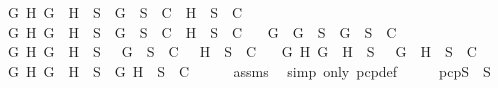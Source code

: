 \begin{isabellebody}
\ \ {\isasymand}\ {\isacharparenleft}{\isasymforall}G\ H{\isachardot}\ G\ \isactrlbold {\isasymor}\ H\ {\isasymin}\ S\ {\isasymlongrightarrow}\ {\isacharbraceleft}G{\isacharbraceright}\ {\isasymunion}\ S\ {\isasymin}\ C\ {\isasymor}\ {\isacharbraceleft}H{\isacharbraceright}\ {\isasymunion}\ S\ {\isasymin}\ C{\isacharparenright}\isanewline
\ \ {\isasymand}\ {\isacharparenleft}{\isasymforall}G\ H{\isachardot}\ G\ \isactrlbold {\isasymrightarrow}\ H\ {\isasymin}\ S\ {\isasymlongrightarrow}\ {\isacharbraceleft}\isactrlbold {\isasymnot}G{\isacharbraceright}\ {\isasymunion}\ S\ {\isasymin}\ C\ {\isasymor}\ {\isacharbraceleft}H{\isacharbraceright}\ {\isasymunion}\ S\ {\isasymin}\ C{\isacharparenright}\isanewline
\ \ {\isasymand}\ {\isacharparenleft}{\isasymforall}G{\isachardot}\ \isactrlbold {\isasymnot}\ {\isacharparenleft}\isactrlbold {\isasymnot}G{\isacharparenright}\ {\isasymin}\ S\ {\isasymlongrightarrow}\ {\isacharbraceleft}G{\isacharbraceright}\ {\isasymunion}\ S\ {\isasymin}\ C{\isacharparenright}\isanewline
\ \ {\isasymand}\ {\isacharparenleft}{\isasymforall}G\ H{\isachardot}\ \isactrlbold {\isasymnot}{\isacharparenleft}G\ \isactrlbold {\isasymand}\ H{\isacharparenright}\ {\isasymin}\ S\ {\isasymlongrightarrow}\ {\isacharbraceleft}\isactrlbold {\isasymnot}\ G{\isacharbraceright}\ {\isasymunion}\ S\ {\isasymin}\ C\ {\isasymor}\ {\isacharbraceleft}\isactrlbold {\isasymnot}\ H{\isacharbraceright}\ {\isasymunion}\ S\ {\isasymin}\ C{\isacharparenright}\isanewline
\ \ {\isasymand}\ {\isacharparenleft}{\isasymforall}G\ H{\isachardot}\ \isactrlbold {\isasymnot}{\isacharparenleft}G\ \isactrlbold {\isasymor}\ H{\isacharparenright}\ {\isasymin}\ S\ {\isasymlongrightarrow}\ {\isacharbraceleft}\isactrlbold {\isasymnot}\ G{\isacharcomma}\ \isactrlbold {\isasymnot}\ H{\isacharbraceright}\ {\isasymunion}\ S\ {\isasymin}\ C{\isacharparenright}\isanewline
\ \ {\isasymand}\ {\isacharparenleft}{\isasymforall}G\ H{\isachardot}\ \isactrlbold {\isasymnot}{\isacharparenleft}G\ \isactrlbold {\isasymrightarrow}\ H{\isacharparenright}\ {\isasymin}\ S\ {\isasymlongrightarrow}\ {\isacharbraceleft}G{\isacharcomma}\isactrlbold {\isasymnot}\ H{\isacharbraceright}\ {\isasymunion}\ S\ {\isasymin}\ C{\isacharparenright}{\isacharparenright}{\isachardoublequoteclose}\isanewline
\ \ \ \ \isamarkupfalse%
\ assms\ \isamarkupfalse%
\ {\isacharparenleft}simp\ only{\isacharcolon}\ pcp{\isacharunderscore}def{\isacharparenright}\isanewline
\ \ \isamarkupfalse%
\ \isamarkupfalse%
\ pcpS{\isacharcolon}{\isachardoublequoteopen}{\isasymbottom}\ {\isasymnotin}\ S\isanewline

\end{isabellebody}
